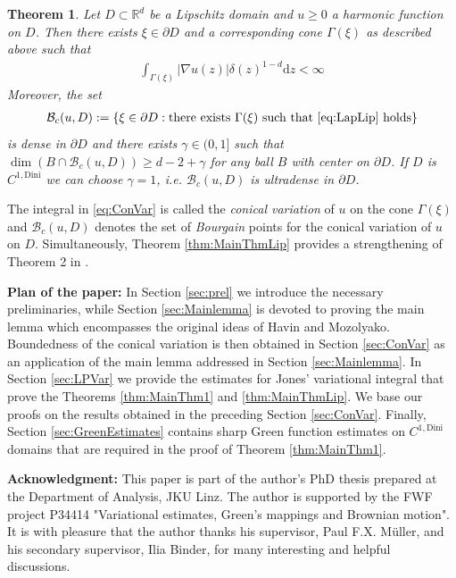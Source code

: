 \documentclass[a4paper,12pt]{article}
\newtheorem{theorem}{Theorem}[section]
\theoremstyle{definition}
\theoremstyle{definition}
\begin{document}
	\begin{theorem}\label{thm:MainThm2}
		Let $D\subset \mathbb R^d$ be a Lipschitz domain and $u\geq 0$ a harmonic function on $D$. Then there exists $\xi\in\partial D$ and a corresponding cone $\Gamma(\xi)$ as described above such that
		\begin{align}\label{eq:LapLip}
			\int_{\Gamma(\xi)}|\nabla u(z)|\delta(z)^{1-d}\mathrm{d}z<\infty
		\end{align}
		Moreover, the set
		\begin{align*}
			\mathcal{B}_c(u, D):=\lbrace\xi\in\partial D: \text{there exists } \Gamma(\xi) \text{ such that }\eqref{eq:LapLip}\text{ holds}\rbrace
		\end{align*} 
		is dense in $\partial D$ and there exists $\gamma\in(0,1]$ such that $\dim(B\cap\mathcal B_c(u,D))\geq d-2+\gamma$ for any ball $B$ with center on $\partial D$. If $D$ is $C^{1,\mathrm{Dini}}$ we can choose $\gamma=1$, i.e. $\mathcal{B}_c(u, D)$ is ultradense in $\partial D$.
	\end{theorem}
	The integral in \eqref{eq:ConVar} is called the \textit{conical variation} of $u$ on the cone $\Gamma(\xi)$ and $\mathcal{B}_c(u, D)$ denotes the set of \textit{Bourgain} points for the conical variation of $u$ on $D$. Simultaneously, Theorem \ref{thm:MainThmLip} provides a strengthening of Theorem 2 in \cite{MuellerRiegler2020}.%
	\\
	\par\textbf{Plan of the paper:} In Section \ref{sec:prel} we introduce the necessary preliminaries, while Section \ref{sec:Mainlemma} is devoted to proving the main lemma which encompasses the original ideas of Havin and Mozolyako. Boundedness of the conical variation is then obtained in Section \ref{sec:ConVar} as an application of the main lemma addressed in Section \ref{sec:Mainlemma}. In Section \ref{sec:LPVar} we provide the estimates for Jones' variational integral that prove the Theorems \ref{thm:MainThm1} and \ref{thm:MainThmLip}. We base our proofs on the results obtained in the preceding Section \ref{sec:ConVar}. Finally, Section \ref{sec:GreenEstimates} contains sharp Green function estimates on $C^{1,\mathrm{Dini}}$ domains that are required in the proof of Theorem \ref{thm:MainThm1}.\par
	\textbf{Acknowledgment:} This paper is part of the author's PhD thesis prepared at the Department of Analysis, JKU Linz. The author is supported by the FWF project P34414 "Variational estimates, Green's mappings and Brownian motion". It is with pleasure that the author thanks his supervisor, Paul F.X. Müller,  and his secondary supervisor, Ilia Binder, for many interesting and helpful discussions.
\end{document}

